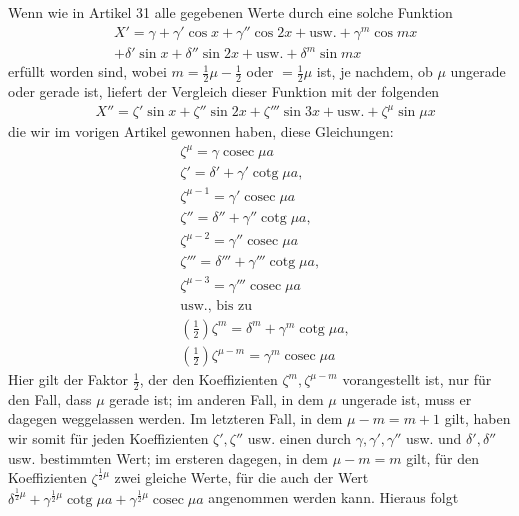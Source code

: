 Wenn wie in Artikel 31 alle gegebenen Werte durch eine solche Funktion
\[
\begin{aligned}
&X'={}\gamma+\gamma'\cos x+\gamma''\cos 2x+\text{usw.}+\gamma^{m}\cos mx\\[5pt]
&+\delta'\sin x+\delta''\sin 2x+\text{usw.}+\delta^{m}\sin mx
\end{aligned}
\]
erfüllt worden sind, wobei $m=\tfrac{1}{2}\mu-\tfrac{1}{2}$ oder $=\tfrac{1}{2}\mu$ ist, je nachdem, ob $\mu$ ungerade oder gerade ist, liefert der Vergleich dieser Funktion mit der folgenden
\[
\begin{aligned}
&X''=\zeta'\sin x+\zeta''\sin 2x+\zeta'''\sin 3x+\text{usw.}+\zeta^{\mu}\sin\mu x
\end{aligned}
\]
die wir im vorigen Artikel gewonnen haben, diese Gleichungen:
\[
\begin{aligned}
&\zeta^{\mu}=\gamma\operatorname{cosec}\mu a\\[5pt]
&\zeta'=\delta'+\gamma'\operatorname{cotg}\mu a,\\[5pt]
&\zeta^{\mu-1}=\gamma'\operatorname{cosec}\mu a\\[5pt]
&\zeta''=\delta''+\gamma''\operatorname{cotg}\mu a,\\[5pt]
&\zeta^{\mu-2}=\gamma''\operatorname{cosec}\mu a\\[5pt]
&\zeta'''=\delta'''+\gamma'''\operatorname{cotg}\mu a,\\[5pt]
&\zeta^{\mu-3}=\gamma'''\operatorname{cosec}\mu a\\[5pt]
&\text{usw., bis zu}\\[5pt]
&(\tfrac{1}{2})\zeta^{m}=\delta^{m}+\gamma^{m}\operatorname{cotg}\mu a,\\[5pt]
&(\tfrac{1}{2})\zeta^{\mu-m}=\gamma^{m}\operatorname{cosec}\mu a
\end{aligned}
\]
Hier gilt der Faktor $\tfrac{1}{2}$, der den Koeffizienten $\zeta^{m},\zeta^{\mu-m}$ vorangestellt ist, nur für den Fall, dass $\mu$ gerade ist; im anderen Fall, in dem $\mu$ ungerade ist, muss er dagegen weggelassen werden. Im letzteren Fall, in dem $\mu-m=m+1$ gilt, haben wir somit für jeden Koeffizienten $\zeta',\zeta''$ usw. einen durch $\gamma,\gamma',\gamma''$ usw. und $\delta',\delta''$ usw. bestimmten Wert; im ersteren dagegen, in dem $\mu-m=m$ gilt, für den Koeffizienten $\zeta^{\frac{1}{2}\mu}$ zwei gleiche Werte, für die auch der Wert $\delta^{\frac{1}{2}\mu}+\gamma^{\frac{1}{2}\mu}\operatorname{cotg}\mu a+\gamma^{\frac{1}{2}\mu}\operatorname{cosec}\mu a$ angenommen werden kann. Hieraus folgt
